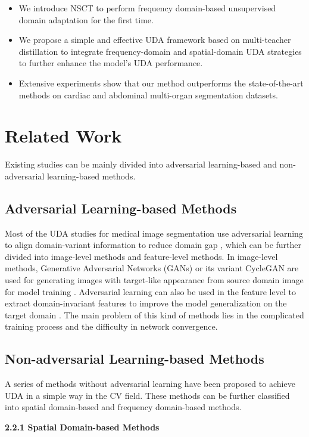 \documentclass[letterpaper]{article} %
\begin{document}
\begin{itemize}
    \item We introduce NSCT to perform frequency domain-based unsupervised domain adaptation for the first time.
    \item We propose a simple and effective UDA framework based on multi-teacher distillation to integrate
    frequency-domain and spatial-domain UDA strategies to further enhance the model's UDA performance.
    \item Extensive experiments show that our method outperforms the state-of-the-art methods on cardiac and abdominal multi-organ segmentation datasets.
\end{itemize}


\section{Related Work}
Existing studies can be mainly divided into adversarial learning-based and non-adversarial learning-based methods.

\subsection{Adversarial Learning-based Methods}
Most of the UDA studies for medical image segmentation use adversarial learning to align domain-variant information to reduce domain gap \cite{1,2,13,14,16,17,18,41},
which can be further divided into image-level methods and feature-level methods. In image-level methods, Generative Adversarial Networks (GANs) or its variant
CycleGAN \cite{17} are used for generating images with target-like appearance from source domain image for model training \cite{1,2,13,14,16,17,18,41}. Adversarial learning
can also be used in the feature level to extract domain-invariant features to improve the model generalization on the target domain \cite{2,13}. The main problem of this kind
of methods lies in the complicated training process and the difficulty in network convergence.

\subsection{Non-adversarial Learning-based Methods}
A series of methods without adversarial learning have been proposed to achieve UDA in a simple way in the CV field.
These methods can be further classified into spatial domain-based and frequency domain-based methods.

\noindent \textbf{2.2.1 Spatial Domain-based Methods}
\end{document}
